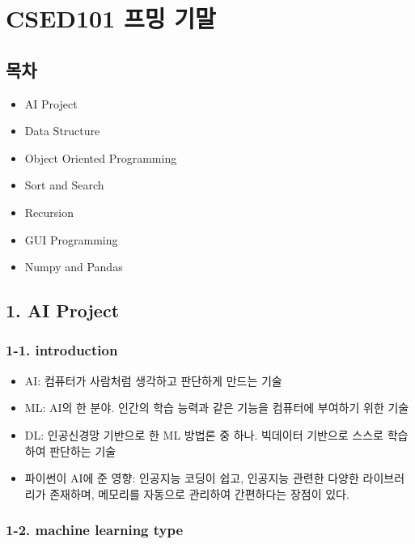 \hypertarget{csed101-uxd504uxbc0d-uxae30uxb9d0}{%
\section{CSED101 프밍 기말}\label{csed101-uxd504uxbc0d-uxae30uxb9d0}}

\hypertarget{uxbaa9uxcc28}{%
\subsection{목차}\label{uxbaa9uxcc28}}

\begin{itemize}
\tightlist
\item
  AI Project
\item
  Data Structure
\item
  Object Oriented Programming
\item
  Sort and Search
\item
  Recursion
\item
  GUI Programming
\item
  Numpy and Pandas
\end{itemize}

\hypertarget{ai-project}{%
\subsection{1. AI Project}\label{ai-project}}

\hypertarget{introduction}{%
\subsubsection{1-1. introduction}\label{introduction}}

\begin{itemize}
\tightlist
\item
  AI: 컴퓨터가 사람처럼 생각하고 판단하게 만드는 기술
\item
  ML: AI의 한 분야. 인간의 학습 능력과 같은 기능을 컴퓨터에 부여하기
  위한 기술
\item
  DL: 인공신경망 기반으로 한 ML 방법론 중 하나. 빅데이터 기반으로 스스로
  학습하여 판단하는 기술
\item
  파이썬이 AI에 준 영향: 인공지능 코딩이 쉽고, 인공지능 관련한 다양한
  라이브러리가 존재하며, 메모리를 자동으로 관리하여 간편하다는 장점이
  있다.
\end{itemize}

\hypertarget{machine-learning-type}{%
\subsubsection{1-2. machine learning type}\label{machine-learning-type}}

